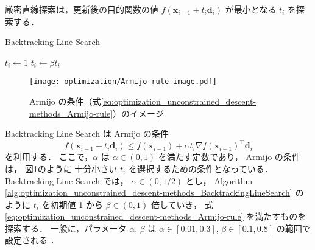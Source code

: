 厳密直線探索は，更新後の目的関数の値
$f(\bm{x}_{i-1} + t_i \bm{d}_i)$
が最小となる $t_i$ を探索する．

\begin{algorithm}[tp]
    \caption{Backtracking Line Search \cite[Section 9.2]{Boyd2004}}
    \label{alg:optimization_unconstrained_descent-methods_BacktrackingLineSearch}
    \begin{algorithmic}[1]
        \State $t_i \gets 1$
        \State $t_i \gets \beta t_i$
        \EndWhile
        \EndProcedure
    \end{algorithmic}
\end{algorithm}

\begin{figure}[tp]
    \centering
    \texttt{[image: optimization/Armijo-rule-image.pdf]}
    \caption{Armijo の条件（式\eqref{eq:optimization_unconstrained_descent-methods_Armijo-rule}）のイメージ}
    \label{fig:optimization_unconstrained_descent-methods_Armijo-rule-image}
\end{figure}

Backtracking Line Search \cite[Section 9.2]{Boyd2004} は
Armijo の条件 \cite[Section 7.5]{Luenberger2003}
\begin{equation}
    f(\bm{x}_{i-1} + t_i \bm{d}_i) \le f(\bm{x}_{i-1}) + \alpha t_i \nabla f(\bm{x}_{i-1})^\top \bm{d}_i
    \label{eq:optimization_unconstrained_descent-methods_Armijo-rule}
\end{equation}
を利用する．
ここで，$\alpha$ は $\alpha \in (0,1)$ を満たす定数であり，
Armijo の条件は，
図\ref{fig:optimization_unconstrained_descent-methods_Armijo-rule-image}のように
十分小さい $t_i$ を選択するための条件となっている．
Backtracking Line Search では，
$\alpha \in (0, 1/2)$ とし，
Algorithm \ref{alg:optimization_unconstrained_descent-methods_BacktrackingLineSearch}
のように
$t_i$ を初期値 1 から $\beta \in (0, 1)$ 倍していき，
式 \eqref{eq:optimization_unconstrained_descent-methods_Armijo-rule} を満たすものを探索する．
一般に，パラメータ $\alpha$, $\beta$ は
$\alpha \in [0.01, 0.3]$, $\beta \in [0.1, 0.8]$ の範囲で設定される
\cite[Section 9.2]{Boyd2004}．

